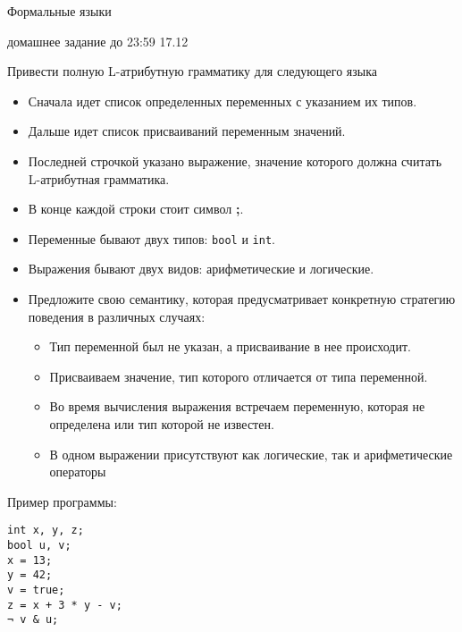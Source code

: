 \documentclass[12pt]{article}
\begin{document}
\begin{center} 
{\LARGE Формальные языки}

{\Large домашнее задание до 23:59 17.12}
\end{center}

\begin{enumerate}
{
   \item { Привести полную L-атрибутную грамматику для следующего языка }
   \begin{itemize}
       \item Сначала идет список определенных переменных с указанием их типов. 
       \item Дальше идет список присваиваний переменным значений.
       \item Последней строчкой указано выражение, значение которого должна считать L-атрибутная грамматика.
       \item В конце каждой строки стоит символ \textbf{;}.
       \item Переменные бывают двух типов: \verb!bool! и \verb!int!.
       \item Выражения бывают двух видов: арифметические и логические. 
       \item Предложите свою семантику, которая предусматривает конкретную стратегию поведения в различных случаях: 
       \begin{itemize}
           \item Тип переменной был не указан, а присваивание в нее происходит.
           \item Присваиваем значение, тип которого отличается от типа переменной.
           \item Во время вычисления выражения встречаем переменную, которая не определена или тип которой не известен.
           \item В одном выражении присутствуют как логические, так и арифметические операторы
       \end{itemize}
   \end{itemize} 
}
\end{enumerate}

Пример программы: 

\begin{verbatim}
int x, y, z;
bool u, v;
x = 13;
y = 42; 
v = true;
z = x + 3 * y - v;
¬ v & u;
\end{verbatim}
\end{document}
